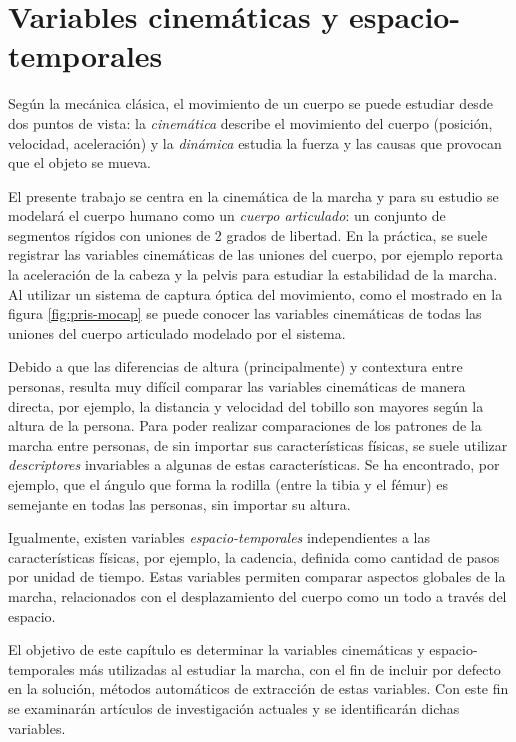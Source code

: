 \chapter[Variables cinemáticas]{Variables cinemáticas y espacio-temporales}

Según la mecánica clásica, el movimiento de un cuerpo se puede estudiar desde dos puntos de vista: la \emph{cinemática} describe el movimiento del cuerpo (posición, velocidad, aceleración) y la \emph{dinámica} estudia la fuerza y las causas que provocan que el objeto se mueva. \citep{giancoli} 

El presente trabajo se centra en la cinemática de la marcha y para su estudio se modelará el cuerpo humano como un \emph{cuerpo articulado}: un conjunto de segmentos rígidos con uniones de 2 grados de libertad. En la práctica, se suele registrar las variables cinemáticas de las uniones del cuerpo, por ejemplo \cite{menz} reporta la aceleración de la cabeza y la pelvis para estudiar la estabilidad de la marcha. Al utilizar un sistema de captura óptica del movimiento, como el mostrado en la figura \ref{fig:pris-mocap} se puede conocer las variables cinemáticas de todas las uniones del cuerpo articulado modelado por el sistema.

Debido a que las diferencias de altura (principalmente) y contextura entre personas, resulta muy difícil comparar las variables cinemáticas de manera directa, por ejemplo, la distancia y velocidad del tobillo son mayores según la altura de la persona. Para poder realizar comparaciones de los patrones de la marcha entre personas, de sin importar sus características físicas, se suele utilizar \emph{descriptores} invariables a algunas de estas características. Se ha encontrado, por ejemplo, que el ángulo que forma la rodilla (entre la tibia y el fémur) es semejante en todas las personas, sin importar su altura. 

Igualmente, existen variables \emph{espacio-temporales} independientes a las características físicas, por ejemplo, la cadencia, definida como cantidad de pasos por unidad de tiempo. Estas variables permiten comparar aspectos globales de la marcha, relacionados con el desplazamiento del cuerpo como un todo a través del espacio. 

El objetivo de este capítulo es determinar la variables cinemáticas y espacio-temporales más utilizadas al estudiar la marcha, con el fin de incluir por defecto en la solución, métodos automáticos de extracción de estas variables. Con este fin se examinarán artículos de investigación actuales y se identificarán dichas variables.










